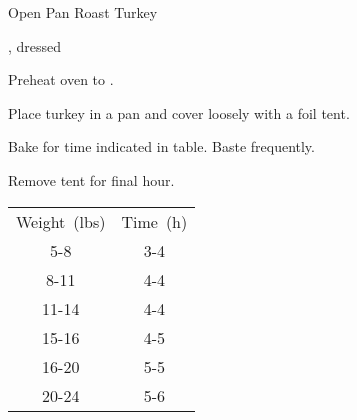 \begin{recipe}{Open Pan Roast Turkey}{}{}

\begin{ingredients}
\item {}, dressed
\end{ingredients}

\begin{directions}
\item Preheat oven to .
\item Place turkey in a pan and cover loosely with a foil tent.
\item Bake for time indicated in table. Baste frequently.
\item Remove tent for final hour.
\end{directions}

\begin{tabular}{|cc|}
\hline
Weight~(lbs) & Time~(h) \\
5-8 & 3\quarter{}-4 \\
8-11 &  4-4\quarter{} \\
11-14 & 4\quarter{}-4\half{} \\
15-16 & 4\half{}-5 \\
16-20 & 5-5\threequarter{} \\
20-24 & 5\threequarter{}-6\half{} \\
\hline
\end{tabular}
\end{recipe}
